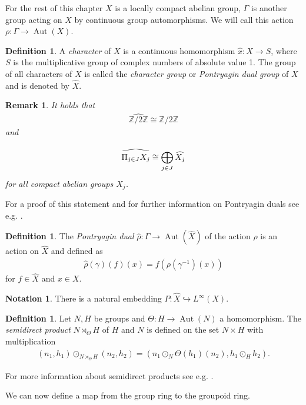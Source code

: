 \documentclass[12pt,a4paper]{scrartcl}
\theoremstyle{plain}
\newtheorem{Remark}[Theorem]{Remark}
\theoremstyle{definition}
\newtheorem{Definition}[Theorem]{Definition}
\newtheorem{Notation}[Theorem]{Notation}
\newcommand{\2}{\mathbb{Z} / 2 \mathbb{Z}}
\newcommand{\1}{\bar{1}}
\newcommand{\0}{\bar{0}}
\newcommand{\Aut}{\operatorname{Aut}}
\newcommand{\reallywidehat}[1]{\arraycolsep=0pt\relax%
	\begin{array}{c}
		\stretchto{
			\scaleto{
				\scalerel*[\widthof{\ensuremath{#1}}]{\kern-.5pt\bigwedge\kern-.5pt}
				{\rule[-\textheight/2]{1ex}{\textheight}} %
			}{\textheight} %
		}{0.5ex}\\           %
		#1\\                 %
		\rule{-1ex}{0ex}
	\end{array}
}
\begin{document}
For the rest of this chapter $X$ is a locally compact abelian group, $\Gamma$ is another group acting on $X$ by continuous group automorphisms. We will call this action $\rho\colon\Gamma \to \Aut(X)$.
\begin{Definition}
	A \emph{character} of $X$ is a continuous homomorphism $\hat{x}\colon X \to S$, where $S$ is the multiplicative group of complex numbers of absolute value 1. The group of all characters of $X$ is called the \emph{character group} or \emph{Pontryagin dual group} of $X$ and is denoted by $\hat{X}$.
\end{Definition}
\begin{Remark} \label{Pontr_berechnen}
	It holds that
	\begin{align*}
		\widehat{\2} \cong \2
	\end{align*}
	and
	\begin{align*}
		\reallywidehat{\Pi_{j \in J} X_j} \cong \bigoplus_{j \in J} \widehat{X_j}
	\end{align*}
	for all compact abelian groups $X_j$.
\end{Remark}
For a proof of this statement and for further information on Pontryagin duals see e.g. \cite[ch. 4]{FOLL}.
\begin{Definition}
	The \emph{Pontryagin dual} $\hat{\rho}\colon\Gamma \to \Aut(\hat{X})$ of the action $\rho$ is an action on $\hat{X}$ and defined as
	\begin{align*}
		\hat{\rho}(\gamma)(f)(x) = f(\rho(\gamma^{-1})(x))
	\end{align*}
	for $f \in \hat{X}$ and $x \in X$.
\end{Definition}
\begin{Notation}
	There is a natural embedding $P \colon \hat{X} \hookrightarrow L^{\infty}(X)$.
\end{Notation}
\begin{Definition}
	Let $N, H$ be groups and $\Theta \colon H \to \Aut(N)$ a homomorphism. The \emph{semidirect product} $N \rtimes_\Theta H$ of $H$ and $N$ is defined on the set $N \times H$ with multiplication 
	\begin{align*}
		(n_1, h_1) \odot_{N \rtimes_\Theta H} (n_2, h_2) = (n_1 \odot_N \Theta(h_1)(n_2), h_1 \odot_H h_2).
	\end{align*}
\end{Definition}

For more information about semidirect products see e.g. \cite[ch. IV.5]{ALG}.

We can now define a map from the group ring to the groupoid ring. 
\end{document}
